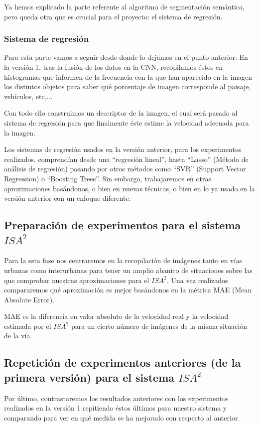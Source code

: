 \documentclass[12pt,oneside,a4paper]{article}
\begin{document}
Ya hemos explicado la parte referente al algoritmo de segmentación semántica, pero queda otra que es crucial para el proyecto: el sistema de regresión.
\subsubsection{Sistema de regresión}

Para esta parte vamos a seguir desde donde lo dejamos en el punto anterior: En la versión 1, tras la fusión de los datos en la CNN, recopilamos éstos en histogramas que informen de la frecuencia con la que han aparecido en la imagen los distintos objetos para saber qué porcentaje de imagen corresponde al paisaje, vehículos, etc,... 

Con todo ello construimos un descriptor de la imagen, el cual será pasado al sistema de regresión para que finalmente éste estime la velocidad adecuada para la imagen.

Los sistemas de regresión usados en la versión anterior, para los experimentos realizados, comprendían desde una ``regresión lineal'', hasta ``Lasso'' (Método de análisis de regresión) pasando por otros métodos como ``SVR'' (Support Vector Regression) o ``Boosting Trees''. Sin embargo, trabajaremos en otras aproximaciones basándonos, o bien en nuevas técnicas, o bien en lo ya usado en la versión anterior con un enfoque diferente. 
\subsection{Preparación de experimentos para el sistema $ISA^2$}

Para la esta fase nos centraremos en la recopilación de imágenes tanto en vías urbanas como interurbanas para tener un amplio abanico de situaciones sobre las que comprobar nuestras aproximaciones para el $ISA^2$. Una vez realizados compararemos qué aproximación es mejor basándonos en la métrica MAE (Mean Absolute Error).

MAE es la diferencia en valor absoluto de la velocidad real y la velocidad estimada por el $ISA^2$ para un cierto número de imágenes de la misma situación de la vía.
\subsection{Repetición de experimentos anteriores (de la primera versión) para el sistema $ISA^2$}

Por último, contrastaremos los resultados anteriores con los experimentos realizados en la versión 1 repitiendo éstos últimos para nuestro sistema y comparando para ver en qué medida se ha mejorado con respecto al anterior.
\end{document}
